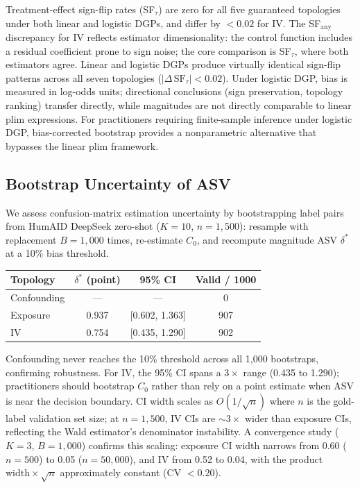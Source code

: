 Treatment-effect sign-flip rates (SF$_\tau$) are zero for all five guaranteed topologies under both linear and logistic DGPs, and differ by $< 0.02$ for IV. The SF$_\text{any}$ discrepancy for IV reflects estimator dimensionality: the control function includes a residual coefficient prone to sign noise; the core comparison is SF$_\tau$, where both estimators agree. Linear and logistic DGPs produce virtually identical sign-flip patterns across all seven topologies ($|\Delta\,\text{SF}_\tau| < 0.02$). Under logistic DGP, bias is measured in log-odds units; directional conclusions (sign preservation, topology ranking) transfer directly, while magnitudes are not directly comparable to linear plim expressions. For practitioners requiring finite-sample inference under logistic DGP, bias-corrected bootstrap provides a nonparametric alternative that bypasses the linear plim framework.

\subsection{Bootstrap Uncertainty of ASV}
\label{sec:bootstrap_asv}

We assess confusion-matrix estimation uncertainty by bootstrapping label pairs from HumAID DeepSeek zero-shot ($K{=}10$, $n{=}1{,}500$): resample with replacement $B{=}1{,}000$ times, re-estimate $C_0$, and recompute magnitude ASV $\delta^*$ at a 10\% bias threshold.

\begin{center}
\small
\begin{tabular}{lccc}
\toprule
Topology & $\delta^*$ (point) & 95\% CI & Valid / 1000 \\
\midrule
Confounding & --- & --- & 0 \\
Exposure & 0.937 & [0.602, 1.363] & 907 \\
IV & 0.754 & [0.435, 1.290] & 902 \\
\bottomrule
\end{tabular}
\end{center}

Confounding never reaches the 10\% threshold across all 1{,}000 bootstraps, confirming robustness. For IV, the 95\% CI spans a $3{\times}$ range (0.435 to 1.290); practitioners should bootstrap $C_0$ rather than rely on a point estimate when ASV is near the decision boundary. CI width scales as $O(1/\sqrt{n})$ where $n$ is the gold-label validation set size; at $n{=}1{,}500$, IV CIs are ${\sim}3{\times}$ wider than exposure CIs, reflecting the Wald estimator's denominator instability. A convergence study ($K{=}3$, $B{=}1{,}000$) confirms this scaling: exposure CI width narrows from 0.60 ($n{=}500$) to 0.05 ($n{=}50{,}000$), and IV from 0.52 to 0.04, with the product $\text{width} \times \sqrt{n}$ approximately constant (CV $< 0.20$).

